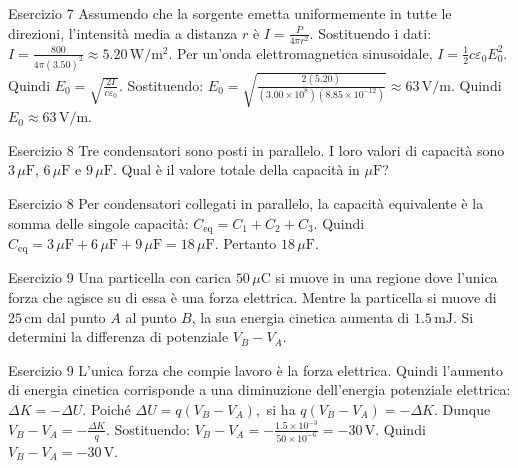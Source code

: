 \documentclass[a4paper]{article}
\begin{document}
\begin{snippetsolution}{Esercizio 7}
    Assumendo che la sorgente emetta uniformemente in tutte le direzioni,
    l'intensità media a distanza \(r\) è
    \(I = \frac{P}{4\pi r^2}.\)
    Sostituendo i dati:
    \(I = \frac{800}{4\pi(3.50)^2} \approx 5.20\,\mathrm{W/m^2}.\)
    Per un'onda elettromagnetica sinusoidale,
    \(I = \frac{1}{2}c\varepsilon_0 E_0^2.\)
    Quindi
    \(E_0 = \sqrt{\frac{2I}{c\varepsilon_0}}.\)
    Sostituendo:
    \(E_0 = \sqrt{ \frac{2(5.20)} {(3.00 \times 10^8)(8.85 \times 10^{-12})} } \approx 63\,\mathrm{V/m}.\)
    Quindi
    \(\boxed{E_0 \approx 63\,\mathrm{V/m}}.\)
\end{snippetsolution}
\begin{snippetexercise}{Esercizio 8}
    Tre condensatori sono posti in parallelo. I loro valori di capacità sono
    \(3\,\mu\mathrm{F}\), \(6\,\mu\mathrm{F}\) e \(9\,\mu\mathrm{F}\).
    Qual è il valore totale della capacità in \(\mu\mathrm{F}\)?
\end{snippetexercise}
\begin{snippetsolution}{Esercizio 8}
    Per condensatori collegati in parallelo, la capacità equivalente è la somma
    delle singole capacità:
    \(C_{\mathrm{eq}} = C_1 + C_2 + C_3.\)
    Quindi
    \(C_{\mathrm{eq}} = 3\,\mu\mathrm{F} + 6\,\mu\mathrm{F} + 9\,\mu\mathrm{F} = 18\,\mu\mathrm{F}.\)
    Pertanto
    \(\boxed{18\,\mu\mathrm{F}}.\)
\end{snippetsolution}
\begin{snippetexercise}{Esercizio 9}
    Una particella con carica \(50\,\mu\mathrm{C}\) si muove in una regione dove
    l'unica forza che agisce su di essa è una forza elettrica. Mentre la
    particella si muove di \(25\,\mathrm{cm}\) dal punto \(A\) al punto \(B\),
    la sua energia cinetica aumenta di \(1.5\,\mathrm{mJ}\). Si determini la
    differenza di potenziale \(V_B - V_A\).
\end{snippetexercise}
\begin{snippetsolution}{Esercizio 9}
    L'unica forza che compie lavoro è la forza elettrica. Quindi l'aumento di
    energia cinetica corrisponde a una diminuzione dell'energia potenziale
    elettrica:
    \(\Delta K = -\Delta U.\)
    Poiché
    \(\Delta U = q(V_B - V_A),\)
    si ha
    \(q(V_B - V_A) = -\Delta K.\)
    Dunque
    \(V_B - V_A = -\frac{\Delta K}{q}.\)
    Sostituendo:
    \(V_B - V_A = -\frac{1.5 \times 10^{-3}}{50 \times 10^{-6}} = -30\,\mathrm{V}.\)
    Quindi
    \(\boxed{V_B - V_A = -30\,\mathrm{V}}.\)
\end{snippetsolution}
\end{document}

